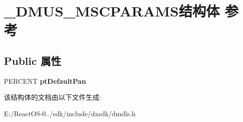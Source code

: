 \hypertarget{struct___d_m_u_s___m_s_c_p_a_r_a_m_s}{}\section{\+\_\+\+D\+M\+U\+S\+\_\+\+M\+S\+C\+P\+A\+R\+A\+M\+S结构体 参考}
\label{struct___d_m_u_s___m_s_c_p_a_r_a_m_s}
\subsection*{Public 属性}
\begin{DoxyCompactItemize}
\item 
\mbox{\label{struct___d_m_u_s___m_s_c_p_a_r_a_m_s_af13b64d6b52a81299c963bdbafbee5eb}} 
P\+E\+R\+C\+E\+NT {\bfseries pt\+Default\+Pan}
\end{DoxyCompactItemize}


该结构体的文档由以下文件生成\+:\begin{DoxyCompactItemize}
\item 
E\+:/\+React\+O\+S-\/0../sdk/include/dxsdk/dmdls.\+h\end{DoxyCompactItemize}
